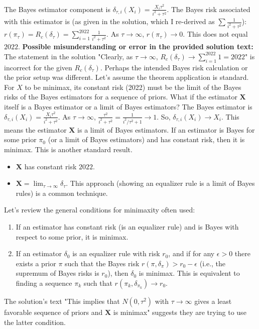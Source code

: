 \begin{enumerate}
The Bayes estimator component is $\delta_{\tau,i}(X_i) = \frac{X_i \tau^2}{i^2+\tau^2}$.
The Bayes risk associated with this estimator is (as given in the solution, which I re-derived as $\sum \frac{1}{i^2+\tau^2}$):
$r(\pi_\tau) = R_c(\delta_\tau) = \sum_{i=1}^{2022} \frac{1}{i^2+\tau^2}$.
As $\tau \to \infty$, $r(\pi_\tau) \to 0$. This does not equal $2022$.
\textbf{Possible misunderstanding or error in the provided solution text:}
The statement in the solution "Clearly, as $\tau \to \infty$, $R_c(\delta_\tau) \to \sum_{i=1}^{2022} 1 = 2022$" is incorrect for the given $R_c(\delta_\tau)$.
Perhaps the intended Bayes risk calculation or the prior setup was different.
Let's assume the theorem application is standard. For $X$ to be minimax, its constant risk (2022) must be the limit of the Bayes risks of the Bayes estimators for a sequence of priors.
What if the estimator $\mathbf{X}$ itself is a Bayes estimator or a limit of Bayes estimators?
The Bayes estimator is $\delta_{\tau,i}(X_i) = \frac{X_i \tau^2}{i^2+\tau^2}$.
As $\tau \to \infty$, $\frac{\tau^2}{i^2+\tau^2} = \frac{1}{i^2/\tau^2 + 1} \to 1$.
So, $\delta_{\tau,i}(X_i) \to X_i$.
This means the estimator $\mathbf{X}$ is a limit of Bayes estimators.
If an estimator is Bayes for some prior $\pi_0$ (or a limit of Bayes estimators) and has constant risk, then it is minimax. This is another standard result.
	\begin{itemize}
		\item $\mathbf{X}$ has constant risk $2022$.
		\item $\mathbf{X} = \lim_{\tau \to \infty} \delta_\tau$.
This approach (showing an equalizer rule is a limit of Bayes rules) is a common technique.
	\end{itemize}
Let's review the general conditions for minimaxity often used:
	\begin{enumerate}
		\item If an estimator has constant risk (is an equalizer rule) and is Bayes with respect to some prior, it is minimax.
		\item If an estimator $\delta_0$ is an equalizer rule with risk $r_0$, and if for any $\epsilon > 0$ there exists a prior $\pi$ such that the Bayes risk $r(\pi, \delta_\pi) > r_0 - \epsilon$ (i.e., the supremum of Bayes risks is $r_0$), then $\delta_0$ is minimax. This is equivalent to finding a sequence $\pi_k$ such that $r(\pi_k, \delta_{\pi_k}) \to r_0$.
	\end{enumerate}
The solution's text "This implies that $N(0, \tau^2)$ with $\tau \to \infty$ gives a least favorable sequence of priors and $\mathbf{X}$ is minimax" suggests they are trying to use the latter condition.

\end{enumerate}
